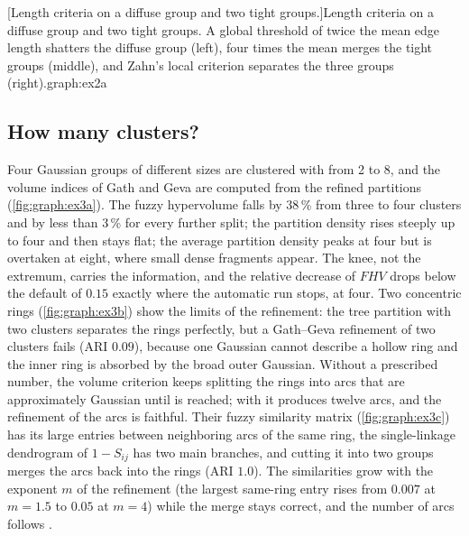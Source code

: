 [Length criteria on a diffuse group and two tight groups.]{Length criteria on a diffuse group and two tight groups. A global threshold of twice the mean edge length shatters the diffuse group (left), four times the mean merges the tight groups (middle), and Zahn's local criterion separates the three groups (right).}{graph:ex2a}

\subsection{How many clusters?}

Four Gaussian groups of different sizes are clustered with  from 2 to 8, and the volume indices of Gath and Geva are computed from the refined partitions (\cref{fig:graph:ex3a}). The fuzzy hypervolume falls by 38\,\% from three to four clusters and by less than 3\,\% for every further split; the partition density rises steeply up to four and then stays flat; the average partition density peaks at four but is overtaken at eight, where small dense fragments appear. The knee, not the extremum, carries the information, and the relative decrease of $FHV$ drops below the default  of $0.15$ exactly where the automatic run stops, at four. Two concentric rings (\cref{fig:graph:ex3b}) show the limits of the refinement: the tree partition with two clusters separates the rings perfectly, but a Gath--Geva refinement of two clusters fails (ARI $0.09$), because one Gaussian cannot describe a hollow ring and the inner ring is absorbed by the broad outer Gaussian. Without a prescribed number, the volume criterion keeps splitting the rings into arcs that are approximately Gaussian until  is reached; with  it produces twelve arcs, and the refinement of the arcs is faithful. Their fuzzy similarity matrix (\cref{fig:graph:ex3c}) has its large entries between neighboring arcs of the same ring, the single-linkage dendrogram of $1-S_{ij}$ has two main branches, and cutting it into two groups merges the arcs back into the rings (ARI $1.0$). The similarities grow with the exponent $m$ of the refinement (the largest same-ring entry rises from $0.007$ at $m=1.5$ to $0.05$ at $m=4$) while the merge stays correct, and the number of arcs follows .

